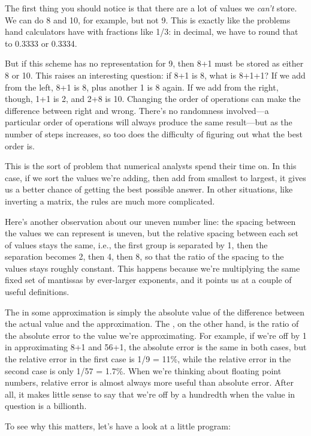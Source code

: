 The first thing you should notice is that there are a lot of values we
\emph{can't} store. We can do 8 and 10, for example, but not 9. This is
exactly like the problems hand calculators have with fractions like 1/3:
in decimal, we have to round that to 0.3333 or 0.3334.

But if this scheme has no representation for 9, then 8+1 must be stored
as either 8 or 10. This raises an interesting question: if 8+1 is 8,
what is 8+1+1? If we add from the left, 8+1 is 8, plus another 1 is 8
again. If we add from the right, though, 1+1 is 2, and 2+8 is 10.
Changing the order of operations can make the difference between right
and wrong. There's no randomness involved---a particular order of
operations will always produce the same result---but as the number of
steps increases, so too does the difficulty of figuring out what the
best order is.

This is the sort of problem that numerical analysts spend their time on.
In this case, if we sort the values we're adding, then add from smallest
to largest, it gives us a better chance of getting the best possible
answer. In other situations, like inverting a matrix, the rules are much
more complicated.

Here's another observation about our uneven number line: the spacing
between the values we can represent is uneven, but the relative spacing
between each set of values stays the same, i.e., the first group is
separated by 1, then the separation becomes 2, then 4, then 8, so that
the ratio of the spacing to the values stays roughly constant. This
happens because we're multiplying the same fixed set of mantissas by
ever-larger exponents, and it points us at a couple of useful
definitions.

The  in some approximation is
simply the absolute value of the difference between the actual value and
the approximation. The , on
the other hand, is the ratio of the absolute error to the value we're
approximating. For example, if we're off by 1 in approximating 8+1 and
56+1, the absolute error is the same in both cases, but the relative
error in the first case is 1/9 = 11\%, while the relative error in the
second case is only 1/57 = 1.7\%. When we're thinking about floating
point numbers, relative error is almost always more useful than absolute
error. After all, it makes little sense to say that we're off by a
hundredth when the value in question is a billionth.

To see why this matters, let's have a look at a little program:

